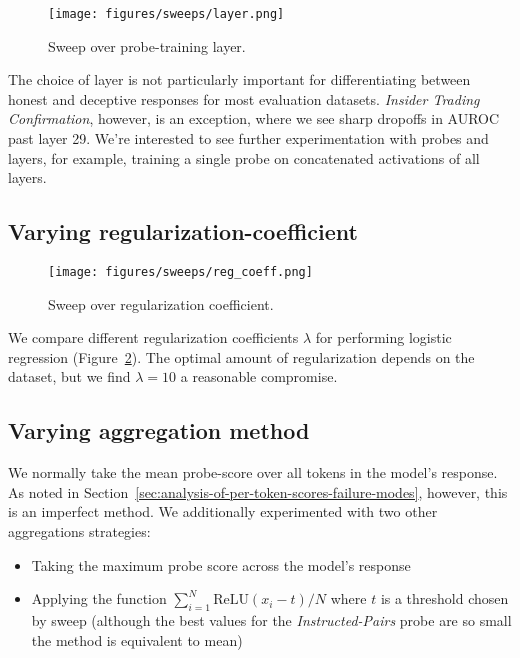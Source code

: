 \documentclass{article}
\begin{document}
\begin{figure}[h]
  \centering
  \texttt{[image: figures/sweeps/layer.png]}
  \caption{Sweep over probe-training layer.}
  \label{fig:layer-bar}
\end{figure}

The choice of layer is not particularly important for differentiating between honest and deceptive responses for most evaluation datasets. 
\emph{Insider Trading Confirmation}, however, is an exception, where we see sharp dropoffs in AUROC past layer 29.
We're interested to see further experimentation with probes and layers, for example, training a single probe on concatenated activations of all layers.

\subsection{Varying regularization-coefficient} \label{appx:reg-coeff}
\begin{figure}[h]
  \centering
  \texttt{[image: figures/sweeps/reg\_coeff.png]}
  \caption{Sweep over regularization coefficient.}
  \label{fig:reg-coeff}
\end{figure}

We compare different regularization coefficients $\lambda$ for performing logistic regression (Figure~\ref{fig:reg-coeff}). The optimal amount of regularization depends on the dataset, but we find $\lambda=10$ a reasonable compromise.

\subsection{Varying aggregation method}\label{appx:aggregation}

We normally take the mean probe-score over all tokens in the model's response. As noted in Section~\ref{sec:analysis-of-per-token-scores-failure-modes}, however, this is an imperfect method. We additionally experimented with two other aggregations strategies:
\begin{itemize}
    \item Taking the maximum probe score across the model's response
    \item Applying the function $\sum_{i=1}^N \text{ReLU}(x_i - t) / N$ where $t$ is a threshold chosen by sweep (although the best values for the \textit{Instructed-Pairs} probe are so small the method is equivalent to mean)
\end{itemize}
\end{document}
